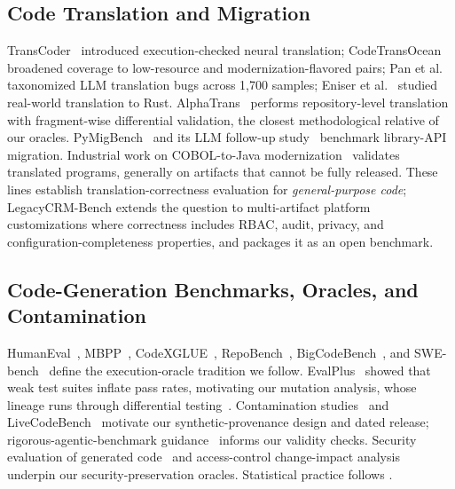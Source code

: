 \documentclass[journal]{IEEEtran}
\begin{document}
\subsection{Code Translation and Migration}
TransCoder~\cite{lachaux2020transcoder} introduced execution-checked neural translation;
CodeTransOcean~\cite{yan2023codetransocean} broadened coverage to low-resource and
modernization-flavored pairs; Pan et al.~\cite{pan2024lost} taxonomized LLM translation bugs
across 1{,}700 samples; Eniser et al.~\cite{eniser2024rust} studied real-world translation to
Rust. AlphaTrans~\cite{ibrahimzada2025alphatrans} performs repository-level translation with
fragment-wise differential validation, the closest methodological relative of our oracles.
PyMigBench~\cite{islam2023pymigbench} and its LLM follow-up study~\cite{islam2025libmigration}
benchmark library-API migration. Industrial work on COBOL-to-Java
modernization~\cite{diggs2024legacy, hans2025coboltesting, kumar2025cobolvalidation,
froimovich2025cobolquality} validates translated programs, generally on artifacts that cannot
be fully released. These lines establish translation-correctness evaluation for
\emph{general-purpose code}; LegacyCRM-Bench extends the question to multi-artifact platform
customizations where correctness includes RBAC, audit, privacy, and configuration-completeness
properties, and packages it as an open benchmark.

\subsection{Code-Generation Benchmarks, Oracles, and Contamination}
HumanEval~\cite{chen2021humaneval}, MBPP~\cite{austin2021mbpp}, CodeXGLUE~\cite{lu2021codexglue},
RepoBench~\cite{liu2023repobench}, BigCodeBench~\cite{zhuo2024bigcodebench}, and
SWE-bench~\cite{jimenez2024swebench} define the execution-oracle tradition we follow.
EvalPlus~\cite{liu2023evalplus} showed that weak test suites inflate pass rates, motivating our
mutation analysis, whose lineage runs through differential testing~\cite{yang2011csmith}.
Contamination studies~\cite{golchin2024timetravel, sainz2023contamination} and
LiveCodeBench~\cite{jain2024livecodebench} motivate our synthetic-provenance design and dated
release; rigorous-agentic-benchmark guidance~\cite{zhu2025rigorous} informs our validity
checks. Security evaluation of generated code~\cite{pearce2022asleep, bhatt2023cyberseceval,
bhatt2024cyberseceval2} and access-control change-impact analysis~\cite{fisler2005margrave}
underpin our security-preservation oracles. Statistical practice follows
\cite{miller2024errorbars, efron1979bootstrap, dror2018hitchhiker}.
\end{document}
